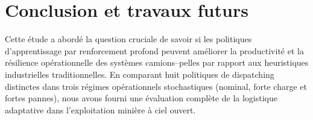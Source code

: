 \documentclass[11pt,a4paper]{article}
\begin{document}
\section{Conclusion et travaux futurs}
\label{sec:conclusion}

Cette étude a abordé la question cruciale de savoir si les politiques d'apprentissage par renforcement profond peuvent améliorer la productivité et la résilience opérationnelle des systèmes camions--pelles par rapport aux heuristiques industrielles traditionnelles. En comparant huit politiques de dispatching distinctes dans trois régimes opérationnels stochastiques (nominal, forte charge et fortes pannes), nous avons fourni une évaluation complète de la logistique adaptative dans l'exploitation minière à ciel ouvert.
\end{document}
